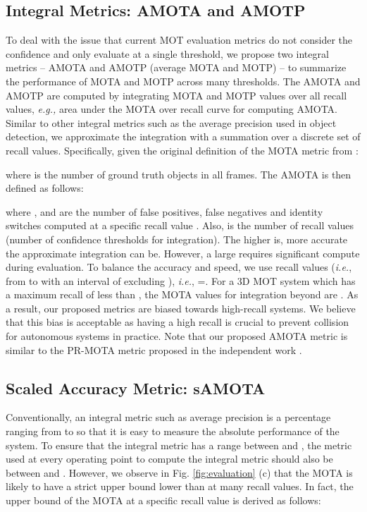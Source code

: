 \documentclass[letterpaper, 10 pt, conference]{ieeeconf}
\begin{document}
\vspace{-0.1cm}
\subsection{Integral Metrics: AMOTA and AMOTP}\label{sec:newmetrics}

To deal with the issue that current MOT evaluation metrics do not consider the confidence and only evaluate at a single threshold, we propose two integral metrics -- AMOTA and AMOTP (average MOTA and MOTP) -- to summarize the performance of MOTA and MOTP across many thresholds. The AMOTA and AMOTP are computed by integrating MOTA and MOTP values over all recall values, \emph{e.g.,} area under the MOTA over recall curve for computing AMOTA. Similar to other integral metrics such as the average precision used in object detection, we approximate the integration with a summation over a discrete set of recall values. Specifically, given the original definition of the MOTA metric from \cite{Bernardin2008}:
\vspace{-0.15cm}

where  is the number of ground truth objects in all frames. The AMOTA is then defined as follows:
\vspace{-0.1cm}

where ,  and  are the number of false positives, false negatives and identity switches computed at a specific recall value . Also,  is the number of recall values (number of confidence thresholds for integration). The higher  is, more accurate the approximate integration can be. However, a large  requires significant compute during evaluation. To balance the accuracy and speed, we use  recall values (\emph{i.e.}, from  to  with an interval of  excluding ), \emph{i.e.}, =. For a 3D MOT system which has a maximum recall of  less than , the MOTA values for integration beyond  are . As a result, our proposed metrics are biased towards high-recall systems. We believe that this bias is acceptable as having a high recall is crucial to prevent collision for autonomous systems in practice. Note that our proposed AMOTA metric is similar to the PR-MOTA metric proposed in the independent work \cite{Wen2020}.

\subsection{Scaled Accuracy Metric: sAMOTA}

Conventionally, an integral metric such as average precision is a percentage ranging from  to  so that it is easy to measure the absolute performance of the system. To ensure that the integral metric has a range between  and , the metric used at every operating point to compute the integral metric should also be between  and . However, we observe in Fig. \ref{fig:evaluation} (c) that the MOTA is likely to have a strict upper bound lower than  at many recall values. In fact, the upper bound of the MOTA at a specific recall value  is derived as follows:
\end{document}
